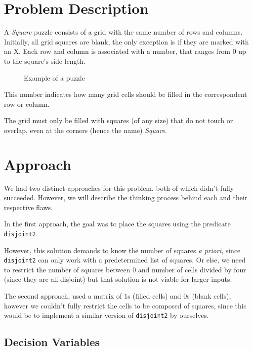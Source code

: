 \documentclass[runningheads]{llncs}
\begin{document}
\section{Problem Description}

A \textit{Square} puzzle consists of a grid with the same number of rows and columns. 
Initially, all grid squares are blank, the only exception is if they are marked with an X.
Each row and column is associated with a number, that ranges from 0 up to the square's side length.

\begin{figure}
    \centering
    \qquad
    \caption{Example of a puzzle}
    \label{fig:example}
\end{figure}

This number indicates how many grid cells should be filled in the correspondent row or column.

The grid must only be filled with squares (of any size) that do not touch or overlap, even at the corners (hence the name) \textit{Square}.

\section{Approach}

We had two distinct approaches for this problem, both of which didn't fully succeeded. However, we will describe the thinking process behind each and their respective flaws.

In the first approach, the goal was to place the squares using the predicate \texttt{disjoint2}.

However, this solution demands to know the number of squares \textit{a priori}, since \texttt{disjoint2} can only work with a predetermined list of squares. Or else, we need to restrict the number of squares between 0 and number of cells divided by four (since they are all disjoint) but that solution is not viable for larger inputs.

The second approach, used a matrix of 1s (filled cells) and 0s (blank cells), however we couldn't fully restrict the cells to be composed of squares, since this would be to implement a similar version of \texttt{disjoint2} by ourselves.

\subsection{Decision Variables}
\end{document}
